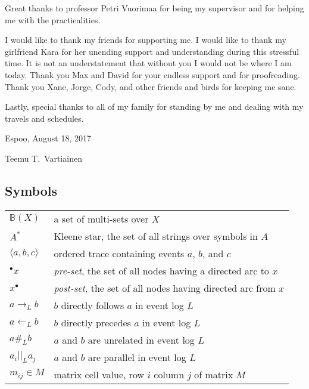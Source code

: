 Great thanks to professor Petri Vuorimaa for being my supervisor and for helping me with the practicalities.

I would like to thank my friends for supporting me.
I would like to thank my girlfriend Kara for her unending support and understanding during this stressful time.
It is not an understatement that without you I would not be where I am today.
Thank you Max and David for your endless support and for proofreading.
Thank you Xane, Jorge, Cody, and other friends and birds for keeping me sane.

Lastly, special thanks to all of my family for standing by me and dealing with my travels and schedules.

\vspace{1cm}
\noindent
Espoo, August 18, 2017

\vspace{5mm}
\noindent
Teemu T.\ Vartiainen

\newpage
\thesistableofcontents


\subsection*{Symbols}

\begin{tabularx}{\linewidth}{l X}
$\mathbb{B}(X)$             & a set of multi-sets over $X$ \\
$A^*$                       & Kleene star, the set of all strings over symbols in $A$ \\
$\langle a,b,c \rangle$     & ordered trace containing events $a$, $b$, and $c$ \\
${}^\bullet x$              & \emph{pre-set}, the set of all nodes having a directed arc to $x$ \\
$x^\bullet$                 & \emph{post-set}, the set of all nodes having directed arc from $x$ \\
$a \rightarrow_L b$         & $b$ directly follows $a$ in event log $L$ \\
$a \leftarrow_L b$          & $b$ directly precedes $a$ in event log $L$ \\
$a \#_L b$                  & $a$ and $b$ are unrelated in event log $L$ \\
$a_i ||_L a_j$              & $a$ and $b$ are parallel in event log $L$ \\
$m_{ij} \in M$              & matrix cell value, row $i$ column $j$ of matrix $M$ \\
\end{tabularx}

